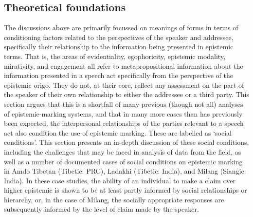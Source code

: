 \subsection{Theoretical foundations}
The discussions above are primarily focussed on meanings of forms in terms of conditioning factors related to the perspectives of the speaker and addressee, specifically their relationship to the information being presented in epistemic terms. That is, the areas of evidentiality, egophoricity, epistemic modality, mirativity, and engagement all refer to metapropositional information about the information presented in a speech act specifically from the perspective of the epistemic origo. They do not, at their core, reflect any assessment on the part of the speaker of their own relationship to either the addressee or a third party. This section argues that this is a shortfall of many previous (though not all) analyses of epistemic-marking systems, and that in many more cases than has previously been expected, the interpersonal relationships of the parties relevant to a speech act also condition the use of epistemic marking. These are labelled as `social conditions'. This section presents an in-depth discussion of these social conditions, including the challenges that may be faced in analysis of data from the field, as well as a number of documented cases of social conditions on epistemic marking in Amdo Tibetan (Tibetic: PRC), Ladakhi (Tibetic: India), and Milang (Siangic: India). In these case studies, the ability of an individual to make a claim over higher epistemic is shown to be at least partly informed by social relationships or hierarchy, or, in the case of Milang, the socially appropriate responses are subsequently informed by the level of claim made by the speaker.

